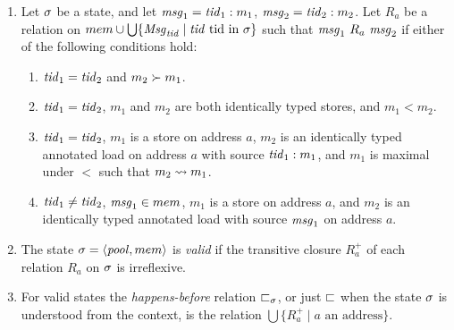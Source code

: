 
\begin{definition}
\label{def:hb}
\mbox{}
\begin{enumerate}
\item Let $\sigma$ be a state, and let $\mathit{msg}_1=\mathit{tid}_1: m_1$, $\mathit{msg}_2=\mathit{tid}_2: m_2$. Let $R_a$ be a relation on $mem\cup\bigcup\{\mathit{Msg}_{\mathit{tid}}\mid \mathit{tid}\ \mbox{tid in }\sigma\}$ such that $\msgvar_1\ R_a\ \msgvar_2$ if
either of the following conditions hold:
\begin{enumerate}
\item $\mathit{tid}_1 = \mathit{tid}_2$ and $m_2 \succ m_1$.
\item $\mathit{tid}_1 = \mathit{tid}_2$, $m_1$ and $m_2$ are both identically typed stores, and $m_1 < m_2$.
\item $\mathit{tid}_1=\mathit{tid}_2$, $m_1$ is a store on address $a$, $m_2$ is an identically typed annotated load on address $a$ with source $\mathit{tid}_1: m_1$, and
$m_1$ is maximal under $<$ such that $m_2\rightsquigarrow m_1$.
\item $\mathit{tid}_1\neq\mathit{tid}_2$, $\mathit{msg}_1\in mem$, $m_1$ is a store on address $a$, and $m_2$ is an identically typed annotated load with source $\mathit{msg}_1$ on address $a$.
\end{enumerate}
\item The state $\sigma=\langle \mathit{pool},mem\rangle$ is \emph{valid} if the
transitive closure $R_a^+$ of each relation $R_a$ on $\sigma$ is irreflexive.
\item
For valid states the \emph{happens-before} relation $\sqsubset_\sigma$, or just $\sqsubset$ when the state $\sigma$ is understood from the context, is the relation
$\bigcup\{R_a^+\mid a\mbox{ an address}\}$.
\end{enumerate}
\end{definition}

